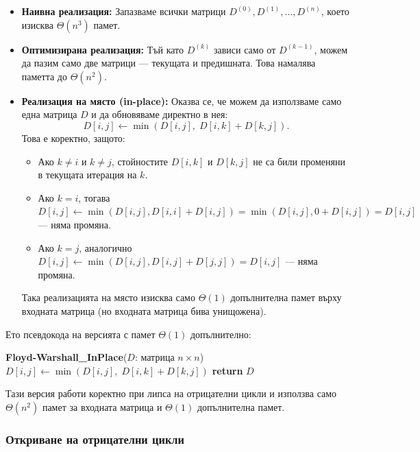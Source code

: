 \documentclass{article}
\renewcommand{\\}{\newline}
\begin{document}
\begin{itemize}
\item \textbf{Наивна реализация:} Запазваме всички матрици \(D^{(0)}, D^{(1)}, \dots, D^{(n)}\), което изисква \(\Theta(n^3)\) памет.
\item \textbf{Оптимизирана реализация:} Тъй като \(D^{(k)}\) зависи само от \(D^{(k-1)}\), можем да пазим само две матрици — текущата и предишната. Това намалява паметта до \(\Theta(n^2)\).
\item \textbf{Реализация на място (in-place):} Оказва се, че можем да използваме само една матрица \(D\) и да обновяваме директно в нея:
\[
D[i, j] \leftarrow \min(D[i, j],\; D[i, k] + D[k, j]).
\]
Това е коректно, защото:
    \begin{itemize}
        \item Ако \(k \ne i\) и \(k \ne j\), стойностите \(D[i, k]\) и \(D[k, j]\) не са били променяни в текущата итерация на \(k\).
        \item Ако \(k = i\), тогава \(D[i, j] \leftarrow \min(D[i, j], D[i, i] + D[i, j]) = \min(D[i, j], 0 + D[i, j]) = D[i, j]\) — няма промяна.
        \item Ако \(k = j\), аналогично \(D[i, j] \leftarrow \min(D[i, j], D[i, j] + D[j, j]) = D[i, j]\) — няма промяна.
    \end{itemize}
Така реализацията на място изисква само \(\Theta(1)\) допълнителна памет върху входната матрица (но входната матрица бива унищожена).
\end{itemize}

Ето псевдокода на версията с памет \(\Theta(1)\) допълнително:

\begin{algorithmic}[1]
\State \textbf{Floyd-Warshall\_InPlace}(\(D\): матрица \(n \times n\))
            \State \(D[i, j] \gets \min(D[i, j],\; D[i, k] + D[k, j])\)
        \EndFor
    \EndFor
\EndFor
\State \textbf{return} \(D\)
\end{algorithmic}

Тази версия работи коректно при липса на отрицателни цикли и използва само \(\Theta(n^2)\) памет за входната матрица и \(\Theta(1)\) допълнителна памет.

\subsubsection{Откриване на отрицателни цикли}
\end{document}
